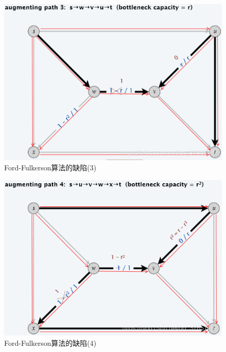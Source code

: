 \begin{figure}[hbt]
	\centering
	\includegraphics[scale=0.6]{image/network-flow-backbone3.png}
	\caption{Ford-Fulkerson算法的缺陷(3)}\label{fig:network-flow-backbone3}
\end{figure}

\begin{figure}[hbt]
	\centering
	\includegraphics[scale=0.6]{image/network-flow-backbone4.png}
	\caption{Ford-Fulkerson算法的缺陷(4)}\label{fig:network-flow-backbone4}
\end{figure}

